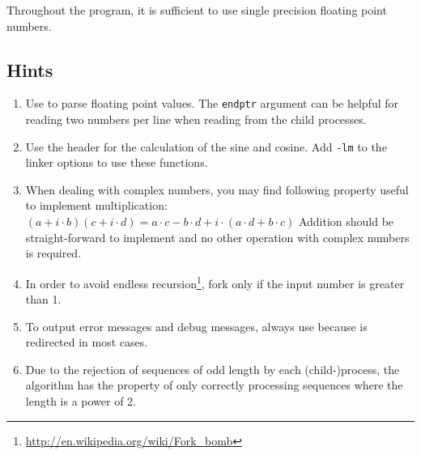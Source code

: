 \begin{enumerate}
\end{enumerate}

Throughout the program,
it is sufficient to use single precision floating point numbers.

\subsection*{Hints}
\begin{enumerate}
\item Use  to parse floating point values.
The \verb|endptr| argument can be helpful for reading two numbers per line
when reading from the child processes.
\item Use the header  for the calculation of the sine and cosine.
Add \verb|-lm| to the linker options to use these functions.
\item When dealing with complex numbers,
you may find following property useful to implement multiplication:
$(a+i\cdot b)(c+i\cdot d)=a\cdot c-b\cdot d+i\cdot(a\cdot d+b\cdot c)$
Addition should be straight-forward to implement
and no other operation with complex numbers is required.
\item In order to avoid endless recursion\footnote{\url{http://en.wikipedia.org/wiki/Fork\_bomb}},
fork only if the input number is greater than 1.
\item To output error messages and debug messages, always use
 because  is redirected in most cases.
\item Due to the rejection of sequences of odd length by each (child-)process,
the algorithm has the property of only correctly processing sequences
where the length is a power of 2.
\end{enumerate}

